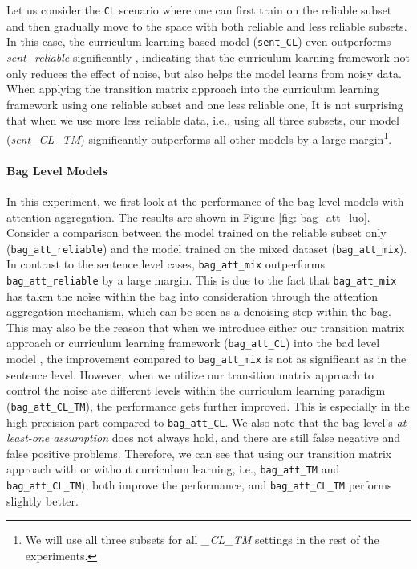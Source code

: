 Let us consider the \texttt{CL} scenario where one can first train on the
reliable subset and then gradually move to the space with both reliable and  less
reliable subsets. In this case, the curriculum learning based model
(\texttt{sent\_CL}) even  outperforms \emph{sent\_reliable} significantly ,
indicating that the curriculum learning framework not only reduces the effect
of noise, but also helps the model learns from noisy data. When applying the
transition matrix approach into the curriculum learning framework using one reliable
subset and one less reliable one,     
It is not surprising that when we use more less reliable data, i.e., using all
three subsets, our model (\emph{sent\_CL\_TM}) significantly outperforms all
other models by a large margin\footnote{We will use all three subsets for all
\emph{\_CL\_TM} settings in the rest of the experiments.}. 


\paragraph{Bag Level Models}
In this experiment, we first look at the performance of the bag level models with attention aggregation. The results are shown in Figure \ref{fig: bag_att_luo}.
Consider a comparison between the  model trained on the reliable subset only (\texttt{bag\_att\_reliable}) and  the model trained on the mixed dataset (\texttt{bag\_att\_mix}).
In contrast to the sentence level cases, \texttt{bag\_att\_mix} outperforms \texttt{bag\_att\_reliable} by a large margin. This is due to the fact that  \texttt{bag\_att\_mix} has taken the noise within the bag into consideration through the attention aggregation mechanism, which can be seen as a denoising step within the bag.
This may also be the reason that when we introduce either our transition matrix approach   or curriculum learning framework (\texttt{bag\_att\_CL})   into the bad level model , the improvement compared to \texttt{bag\_att\_mix}  is not as significant as in the sentence level.
However, when we utilize our transition matrix approach to control the noise ate different levels within the curriculum learning paradigm (\texttt{bag\_att\_CL\_TM}), the performance gets further improved. This is especially in the high precision part compared to \texttt{bag\_att\_CL}.
We also note that the bag level's  \textit{at-least-one assumption} does not always hold, and there are still false negative and false positive problems. Therefore, we can see that using our transition matrix approach with  or without curriculum learning, i.e.,  \texttt{bag\_att\_TM}  and \texttt{bag\_att\_CL\_TM}), both improve the performance, and \texttt{bag\_att\_CL\_TM} performs slightly better.

